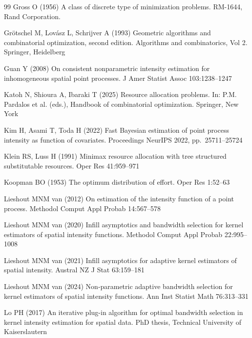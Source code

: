 \documentclass[twoside,11pt]{article}
\begin{document}
\begin{thebibliography}{99}
Gross O (1956)
A class of discrete type of minimization problems.
RM-1644, Rand Corporation. 

Gr\"otschel M, Lov\'asz L, Schrijver A (1993)
Geometric algorithms and combinatorial optimization, second edition.
Algorithms and combinatorics, Vol 2.
Springer, Heidelberg


Guan Y (2008)
On consistent nonparametric intensity estimation for 
inhomogeneous spatial point processes.
J Amer Statist Assoc 103:1238--1247

Katoh N, Shioura A, Ibaraki T (2025)
Resource allocation problems.
In: P.M. Pardalos et al. (eds.), 
Handbook of combinatorial optimization.
Springer, New York

Kim H, Asami T, Toda H (2022)
Fast {B}ayesian estimation of point process 
intensity as function of covariates.
Proceedings NeurIPS 2022, pp.~25711--25724

Klein RS, Luss H (1991)
Minimax resource allocation with tree structured substitutable
resources. 
Oper Res 41:959--971

Koopman BO (1953)
The optimum distribution of effort. 
Oper Res 1:52--63

Lieshout MNM van (2012)
On estimation of the intensity function of a point process.
Methodol Comput Appl Probab 14:567--578

Lieshout MNM van (2020)
Inﬁll asymptotics and bandwidth selection for kernel estimators 
of spatial intensity functions.
Methodol Comput Appl Probab 22:995--1008

Lieshout MNM van (2021)
Infill asymptotics for adaptive kernel estimators of spatial intensity.
Austral NZ J Stat 63:159--181

Lieshout MNM van (2024)
Non‑parametric adaptive bandwidth selection for kernel 
estimators of spatial intensity functions.
Ann Inst Statist Math 76:313--331 

Lo PH (2017)
An iterative plug-in algorithm for optimal bandwidth 
selection in kernel intensity estimation for spatial data.
PhD thesis, Technical University of Kaiserslautern


\end{thebibliography}
\end{document}
